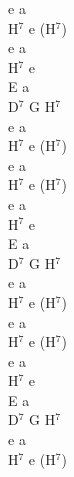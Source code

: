 \documentclass[a5paper, 10pt]{book}
\begin{document}
\begin{minipage}[t]{0.18\textwidth}
  e a\\
  H$^7$ e (H$^7$)\\
  e a\\
  H$^7$ e\\
  E a\\
  D$^7$ G H$^7$\\
  e a\\
  H$^7$ e (H$^7$)\\

  e a\\
  H$^7$ e (H$^7$)\\
  e a\\
  H$^7$ e\\
  E a\\
  D$^7$ G H$^7$\\
  e a\\
  H$^7$ e (H$^7$)\\

  e a\\
  H$^7$ e (H$^7$)\\
  e a\\
  H$^7$ e\\
  E a\\
  D$^7$ G H$^7$\\
  e a\\
  H$^7$ e (H$^7$)\\
\end{minipage}

\newpage
\end{document}
